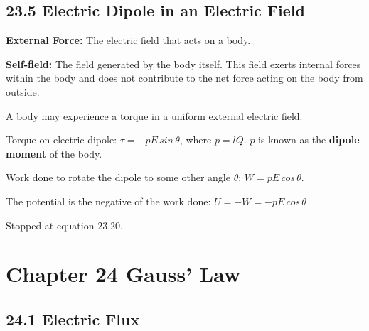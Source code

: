 \documentclass[twocolumn]{article}
\newenvironment{small_item}{
\begin{itemize}
  \setlength{\itemsep}{.25pt}
  \setlength{\parskip}{0pt}
  \setlength{\parsep}{0pt}
}{\end{itemize}}
\begin{document}
	\subsection*{23.5 Electric Dipole in an Electric Field} %
	\label{sub:23_5_electric_dipole_in_an_electric_field}
	
	\begin{small_item}
		\item \textbf{External Force:} The electric field that acts on a body.
		\item \textbf{Self-field:} The field generated by the body itself.  This field exerts internal forces within the body and does not contribute to the net force acting on the body from outside.
		\item A body may experience a torque in a uniform external electric field.
		\item Torque on electric dipole: $\tau = -pE\,sin\,\theta$, where $p = lQ$.  $p$ is known as the \textbf{dipole moment} of the body.
		\item Work done to rotate the dipole to some other angle $\theta$: $W = pE\,cos\,\theta$.
		\item The potential is the negative of the work done: $U = -W = -pE\,cos\,\theta$
		\item Stopped at equation 23.20.
	\end{small_item}

	
	
	\section*{Chapter 24 Gauss' Law} %
	\label{sec:chapter_24_gauss_law}
	
	\subsection*{24.1 Electric Flux} %
	\label{sub:24_1_electric_flux}
	
\end{document}
